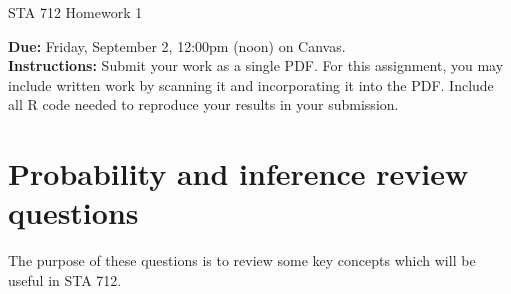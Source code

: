 \documentclass[11pt]{article}
\begin{document}
\begin{center}
\Large
STA 712 Homework 1\\
\normalsize
\vspace{5mm}
\end{center}

\noindent \textbf{Due:} Friday, September 2, 12:00pm (noon) on Canvas.\\ 

\noindent \textbf{Instructions:} Submit your work as a single PDF. For this assignment, you may include written work by scanning it and incorporating it into the PDF. Include all R code needed to reproduce your results in your submission.

\section*{Probability and inference review questions}

The purpose of these questions is to review some key concepts which will be useful in STA 712.
\end{document}
